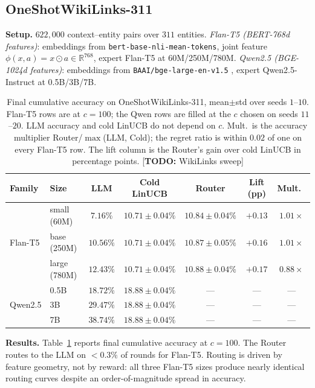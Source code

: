 \documentclass{article}
\theoremstyle{definition}
\theoremstyle{remark}
\theoremstyle{remark}
\newcommand{\todo}[1]{\textcolor{red!70!black}{[\textbf{TODO:} #1]}}
\begin{document}
\subsection{OneShotWikiLinks-311}
\label{sec:wiki}

\textbf{Setup.} $622{,}000$ context--entity pairs over $311$ entities.
\emph{Flan-T5 (BERT-768d features)}: embeddings from
\texttt{bert-base-nli-mean-tokens}, joint feature $\phi(x,a)=x\odot a\in\mathbb R^{768}$,
expert Flan-T5 \cite{chung2024scaling} at 60M/250M/780M.
\emph{Qwen2.5 (BGE-1024d features)}: embeddings from
\texttt{BAAI/bge-large-en-v1.5} \cite{xiao2024c}, expert Qwen2.5-Instruct
\cite{hui2024qwen2} at 0.5B/3B/7B.

\begin{table}[h]
\centering
\caption{Final cumulative accuracy on OneShotWikiLinks-311, mean$\pm$std over
seeds $1$--$10$. Flan-T5 rows are at $c=100$; the Qwen rows are filled at the
$c$ chosen on seeds $11$--$20$. LLM accuracy and cold LinUCB do not depend on
$c$. Mult.\ is the accuracy multiplier Router/$\max$(LLM, Cold); the regret
ratio is within $0.02$ of one on every Flan-T5 row. The lift column is the
Router's gain over cold LinUCB in percentage points. \todo{WikiLinks sweep}}
\label{tab:wiki-results}
\small
\begin{tabular}{@{}llccccc@{}}
\toprule
Family & Size & LLM & Cold LinUCB & Router & Lift (pp) & Mult.\ \\
\midrule
\multirow{3}{*}{Flan-T5} & small (60M) & $7.16\%$  & $10.71\pm 0.04\%$ & $10.84\pm 0.04\%$ & $+0.13$ & $1.01\times$ \\
& base (250M)   & $10.56\%$ & $10.71\pm 0.04\%$ & $10.87\pm 0.05\%$ & $+0.16$ & $1.01\times$ \\
& large (780M)  & $12.43\%$ & $10.71\pm 0.04\%$ & $10.88\pm 0.04\%$ & $+0.17$ & $0.88\times$ \\
\midrule
\multirow{3}{*}{Qwen2.5} & 0.5B  & $18.72\%$ & $18.88\pm 0.04\%$ & --- & --- & --- \\
& 3B  & $29.47\%$ & $18.88\pm 0.04\%$ & --- & --- & --- \\
& 7B  & $38.74\%$ & $18.88\pm 0.04\%$ & --- & --- & --- \\
\bottomrule
\end{tabular}
\end{table}

\textbf{Results.} Table~\ref{tab:wiki-results} reports final cumulative
accuracy at $c=100$. The Router routes to the LLM on $<0.3\%$ of rounds for
Flan-T5. Routing is driven by feature geometry, not by
reward: all three Flan-T5 sizes produce nearly identical routing curves
despite an order-of-magnitude spread in accuracy.
\end{document}

